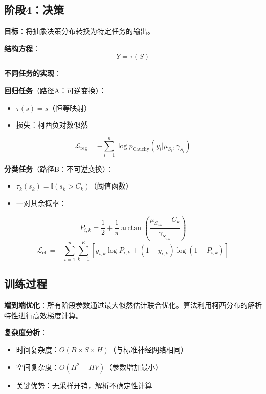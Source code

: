 \documentclass[conference]{IEEEtran}
\newcommand{\cauchy}{\text{Cauchy}}
\newcommand{\indicator}{\mathbb{I}}
\begin{document}
\begin{CJK}{UTF8}{gbsn}
\subsection{阶段4：决策}

\textbf{目标}：将抽象决策分布转换为特定任务的输出。

\textbf{结构方程}：
\begin{equation}
Y = \tau(S)
\end{equation}

\textbf{不同任务的实现}：

\textbf{回归任务}（路径A：可逆变换）：
\begin{itemize}
\item $\tau(s) = s$（恒等映射）
\item 损失：柯西负对数似然
\end{itemize}
\begin{equation}
\mathcal{L}_{\text{reg}} = -\sum_{i=1}^n \log p_{\cauchy}(y_i | \mu_{S_i}, \gamma_{S_i})
\end{equation}

\textbf{分类任务}（路径B：不可逆变换）：
\begin{itemize}
\item $\tau_k(s_k) = \indicator(s_k > C_k)$（阈值函数）  
\item 一对其余概率：
\end{itemize}
\begin{equation}
P_{i,k} = \frac{1}{2} + \frac{1}{\pi} \arctan\left(\frac{\mu_{S_{i,k}} - C_k}{\gamma_{S_{i,k}}}\right)
\end{equation}
\begin{equation}
\mathcal{L}_{\text{clf}} = -\sum_{i=1}^n \sum_{k=1}^K [y_{i,k} \log P_{i,k} + (1-y_{i,k}) \log(1-P_{i,k})]
\end{equation}

\subsection{训练过程}

\textbf{端到端优化}：所有阶段参数通过最大似然估计联合优化。算法利用柯西分布的解析特性进行高效梯度计算。

\textbf{复杂度分析}：
\begin{itemize}
\item 时间复杂度：$O(B \times S \times H)$（与标准神经网络相同）
\item 空间复杂度：$O(H^2 + HV)$（参数增加最小）
\item 关键优势：无采样开销，解析不确定性计算
\end{itemize}


\end{CJK}
\end{document}
